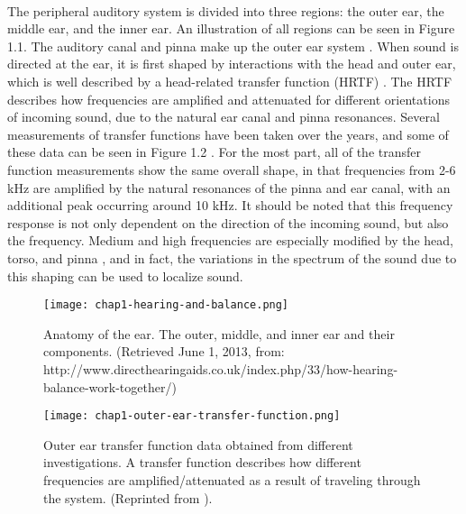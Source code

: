 \paragraph{}The peripheral auditory system is divided into three regions: the outer ear, the middle ear, and the inner ear.  An illustration of all regions can be seen in Figure 1.1.  The auditory canal and pinna make up the outer ear system \cite{Moore2007}.  When sound is directed at the ear, it is first shaped by interactions with the head and outer ear, which is well described by a head-related transfer function (HRTF) \cite{Wiener1946}.  The HRTF describes how frequencies are amplified and attenuated for different orientations of incoming sound, due to the natural ear canal and pinna resonances.  Several measurements of transfer functions have been taken over the years, and some of these data can be seen in Figure 1.2 \cite{Mehrgardt1977}.  For the most part, all of the transfer function measurements show the same overall shape, in that frequencies from 2-6 kHz are amplified by the natural resonances of the pinna and ear canal, with an additional peak occurring around 10 kHz.  It should be noted that this frequency response is not only dependent on the direction of the incoming sound, but also the frequency.  Medium and high frequencies are especially modified by the head, torso, and pinna \cite{Moore2007}, and in fact, the variations in the spectrum of the sound due to this shaping can be used to localize sound.

\begin{figure}[htbp]
\begin{center}
\texttt{[image: chap1-hearing-and-balance.png]} \\
\caption[Anatomy of the ear]{Anatomy of the ear.  The outer, middle, and inner ear and their components.  (Retrieved June 1, 2013, from: http://www.directhearingaids.co.uk/index.php/33/how-hearing-balance-work-together/)}
\label{ear-anatomy}
\end{center}
\end{figure}

\begin{figure}[htbp]
\begin{center}
\texttt{[image: chap1-outer-ear-transfer-function.png]} \\
\caption[Outer ear transfer function]{Outer ear transfer function data obtained from different investigations.  A transfer function describes how different frequencies are amplified/attenuated as a result of traveling through the system.  (Reprinted from ).}
\label{outer-tf}
\end{center}
\end{figure}

